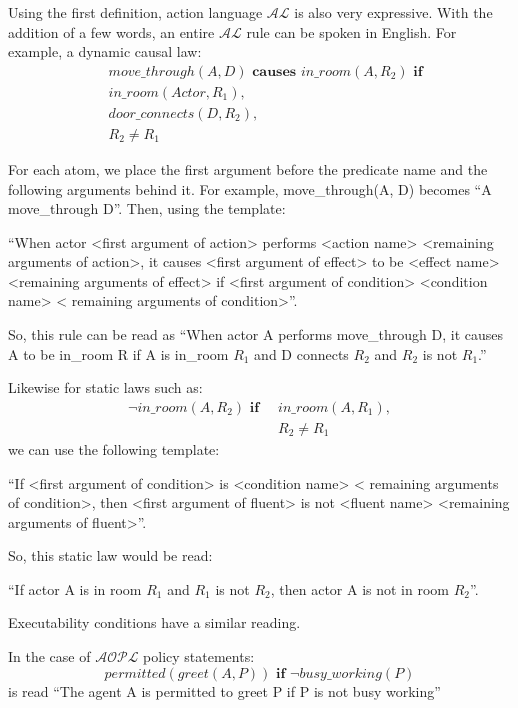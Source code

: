 Using the first definition, action language $\mathcal{AL}$ is also very expressive.
With the addition of a few words, an entire $\mathcal{AL}$ rule can be spoken in English.
For example, a dynamic causal law:
\begin{equation}
\begin{split}
    & move\_through(A, D) \textbf{ causes } in\_room(A, R_{2}) \textbf{ if} \\
    & in\_room(Actor, R_{1}), \\
    & door\_connects(D, R_{2}), \\
    & R_{2} \neq R_{1}
\end{split}
\end{equation}

For each atom, we place the first argument before the predicate name and the following arguments behind it.
For example, move\_through(A, D) becomes ``A move\_through D''.
Then, using the template:

``When actor <first argument of action> performs <action name> <remaining arguments of action>, it causes <first argument of effect> to be <effect name> <remaining arguments of effect> if <first argument of condition> <condition name> < remaining arguments of condition>''.

So, this rule can be read as ``When actor A performs move\_through D, it causes A to be in\_room R if A is in\_room $R_{1}$ and D connects $R_{2}$ and $R_{2}$ is not $R_{1}$.''

Likewise for static laws such as:
\begin{equation}
\begin{split}
    \neg in\_room(A, R_{2}) \textbf{ if } \
        & in\_room(A, R_{1}), \\
        & R_{2} \neq R_{1}
\end{split}
\end{equation}
we can use the following template:

``If <first argument of condition> is <condition name> < remaining arguments of condition>, then <first argument of fluent> is not <fluent name> <remaining arguments of fluent>''.

So, this static law would be read:

``If actor A is in room $R_{1}$ and $R_{1}$ is not $R_{2}$, then actor A is not in room $R_{2}$''.

Executability conditions have a similar reading.

In the case of $\mathcal{AOPL}$ policy statements:
\begin{equation}
    permitted(greet(A, P)) \textbf{ if }
        \neg busy\_working(P)
\end{equation}
is read ``The agent A is permitted to greet P if P is not busy working''


